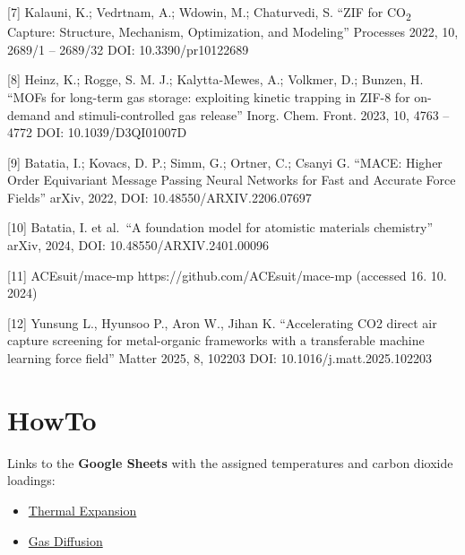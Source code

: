 \documentclass[
  letterpaper,
  DIV=11,
  numbers=noendperiod]{scrreprt}
\providecommand{\tightlist}{%
  \setlength{\itemsep}{0pt}\setlength{\parskip}{0pt}}\usepackage{longtable,booktabs,array}
\begin{document}
{[}7{]} Kalauni, K.; Vedrtnam, A.; Wdowin, M.; Chaturvedi, S. ``ZIF for
CO\textsubscript{2} Capture: Structure, Mechanism, Optimization, and
Modeling'' Processes 2022, 10, 2689/1 -- 2689/32 DOI: 10.3390/pr10122689

{[}8{]} Heinz, K.; Rogge, S. M. J.; Kalytta-Mewes, A.; Volkmer, D.;
Bunzen, H. ``MOFs for long-term gas storage: exploiting kinetic trapping
in ZIF-8 for on-demand and stimuli-controlled gas release'' Inorg. Chem.
Front. 2023, 10, 4763 -- 4772 DOI: 10.1039/D3QI01007D

{[}9{]} Batatia, I.; Kovacs, D. P.; Simm, G.; Ortner, C.; Csanyi G.
``MACE: Higher Order Equivariant Message Passing Neural Networks for
Fast and Accurate Force Fields'' arXiv, 2022, DOI:
10.48550/ARXIV.2206.07697

{[}10{]} Batatia, I. et al.~``A foundation model for atomistic materials
chemistry'' arXiv, 2024, DOI: 10.48550/ARXIV.2401.00096

{[}11{]} ACEsuit/mace-mp https://github.com/ACEsuit/mace-mp (accessed
16. 10. 2024)

{[}12{]} Yunsung L., Hyunsoo P., Aron W., Jihan K. ``Accelerating CO2
direct air capture screening for metal-organic frameworks with a
transferable machine learning force field'' Matter 2025, 8, 102203 DOI:
10.1016/j.matt.2025.102203

\hypertarget{howto}{%
\chapter{HowTo}\label{howto}}

\begin{tcolorbox}[enhanced jigsaw, title=\textcolor{quarto-callout-warning-color}{\faExclamationTriangle}\hspace{0.5em}{Warning}, colbacktitle=quarto-callout-warning-color!10!white, bottomtitle=1mm, breakable, colframe=quarto-callout-warning-color-frame, toprule=.15mm, opacitybacktitle=0.6, bottomrule=.15mm, titlerule=0mm, arc=.35mm, rightrule=.15mm, toptitle=1mm, coltitle=black, left=2mm, opacityback=0, colback=white, leftrule=.75mm]

Links to the \textbf{Google Sheets} with the assigned temperatures and
carbon dioxide loadings:

\begin{itemize}
\tightlist
\item
  \href{https://docs.google.com/spreadsheets/d/1wLiVdocFKj4iYNReIv2KdyEh5-HF7x3P1qJy946fHts/edit?usp=sharing}{Thermal
  Expansion}
\item
  \href{https://docs.google.com/spreadsheets/d/1k56gQvhw8spThA9WNhdUirlWV9gKY-G1va8DjMysdBU/edit?usp=sharing}{Gas
  Diffusion}
\end{itemize}

\end{tcolorbox}
\end{document}

